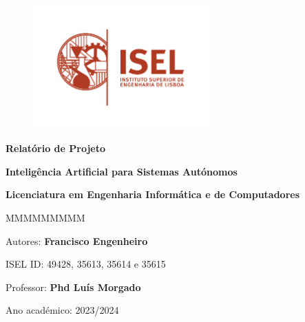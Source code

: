 \begin{figure}
    \centering
    \includegraphics[width=0.6\textwidth]{../figures/logo-isel}
    \label{fig:isel-logo}
\end{figure}

\begin{center}

    \vspace*{2cm} %

    \textbf{\Huge{}Relatório de Projeto}

    \vspace{1cm}

    \textbf{\LARGE{}Inteligência Artificial para Sistemas Autónomos}

    \textbf{\large{}Licenciatura em Engenharia Informática e de Computadores}{\huge\par}


    \vfill{} %

    \begin{lyxlist}{MMMMMMMMM}
        \begin{singlespace}
            \item [{Autores:}] \textbf{Francisco Engenheiro}
            \item [{ISEL ID:}]  49428, 35613, 35614 e 35615
            \item [{Professor:}] \textbf{Phd Luís Morgado}
            \item [{Ano académico:}] 2023/2024
        \end{singlespace}
    \end{lyxlist}
\end{center}
